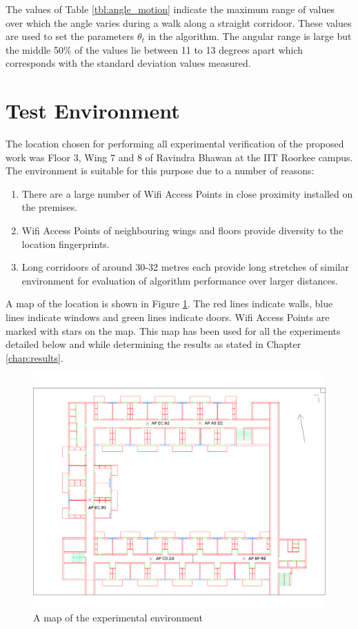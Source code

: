 The values of Table \ref{tbl:angle_motion} indicate the maximum range of 
values over which the angle varies during a walk along a straight corridoor. 
These values are used to set the parameters $\theta_t$ in the algorithm.
The angular range is large but the middle 50\% of the values lie 
between 11 to 13 degrees apart which corresponds with the standard deviation
values measured.

\section{Test Environment\label{sec:test_environment}}

The location chosen for performing all experimental verification of the
proposed work was Floor 3, Wing 7 and 8 of Ravindra Bhawan at the IIT Roorkee
campus. The environment is suitable for this purpose due to a number of reasons:

\begin{enumerate}
\item There are a large number of Wifi Access Points in close proximity 
    installed on the premises.
\item Wifi Access Points of neighbouring wings and floors provide diversity
    to the location fingerprints.
\item Long corridoors of around 30-32 metres each provide long stretches of
    similar environment for evaluation of algorithm performance over larger
    distances.
\end{enumerate}

A map of the location is shown in Figure \ref{fig:ravindra_map}. The red lines
indicate walls, blue lines indicate windows and green lines indicate doors.
Wifi Access Points are marked with stars on the map. This map has been used
for all the experiments detailed below and while determining the results as 
stated in Chapter \ref{chap:results}.

\begin{figure}
    \centering
    \includegraphics[width=5in]{figures/ravindra_map_ap.png}
    \caption{A map of the experimental environment\label{fig:ravindra_map}}
\end{figure}


